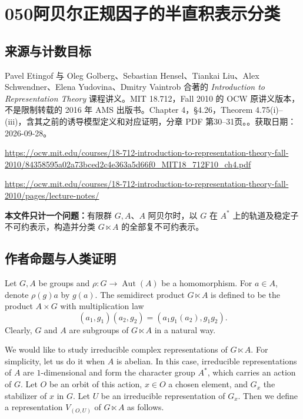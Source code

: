 \documentclass[UTF8,11pt]{ctexart}
\theoremstyle{definition}
\DeclareMathOperator{\Aut}{Aut}
\begin{document}
\section*{050\quad 阿贝尔正规因子的半直积表示分类}
\subsection*{来源与计数目标}
Pavel Etingof 与 Oleg Golberg、Sebastian Hensel、Tiankai Liu、Alex Schwendner、Elena Yudovina、Dmitry Vaintrob 合著的 \emph{Introduction to Representation Theory} 课程讲义。MIT 18.712，Fall 2010 的 OCW 原讲义版本，不是限制转载的 2016 年 AMS 出版书。Chapter 4，\S4.26，Theorem 4.75(i)--(iii)，含其之前的诱导模型定义和对应证明，分章 PDF 第30--31页。。获取日期：2026-09-28。
\par\url{https://ocw.mit.edu/courses/18-712-introduction-to-representation-theory-fall-2010/84358595a02a73bced2c4e363a5d66f0_MIT18_712F10_ch4.pdf}
\par\url{https://ocw.mit.edu/courses/18-712-introduction-to-representation-theory-fall-2010/pages/lecture-notes/}
\par\textbf{本文件只计一个问题：}有限群 $G,A$、$A$ 阿贝尔时，以 $G$ 在 $A^*$ 上的轨道及稳定子不可约表示，构造并分类 $G\ltimes A$ 的全部复不可约表示。
\subsection*{作者命题与人类证明}

Let $G,A$ be groups and $\rho:G\to\Aut(A)$ be a homomorphism. For $a\in A$, denote $\rho(g)a$ by $g(a)$. The semidirect product $G\ltimes A$ is defined to be the product $A\times G$ with multiplication law
\[
(a_1,g_1)(a_2,g_2)=(a_1g_1(a_2),g_1g_2).
\]
Clearly, $G$ and $A$ are subgroups of $G\ltimes A$ in a natural way.

We would like to study irreducible complex representations of $G\ltimes A$. For simplicity, let us do it when $A$ is abelian. In this case, irreducible representations of $A$ are $1$-dimensional and form the character group $A^*$, which carries an action of $G$. Let $O$ be an orbit of this action, $x\in O$ a chosen element, and $G_x$ the stabilizer of $x$ in $G$. Let $U$ be an irreducible representation of $G_x$. Then we define a representation $V_{(O,U)}$ of $G\ltimes A$ as follows.
\end{document}
